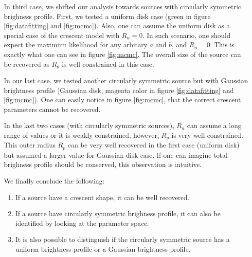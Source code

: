 In third case, we shifted our analysis towards sources with circularly symmetric brighness profile. First, we tested a uniform disk case (green in figure \ref{fig:datafitting} and \ref{fig:mcmc}). Also, one can assume the uniform disk as a special case of the crescent model with $R_n = 0$. In such scenario, one should expect the maximum likelihood for any arbitary $a$ and $b$, and $R_n = 0$. This is exactly what one can see in figure \ref{fig:mcmc}. The overall size of the source can be recovered as $R_p$ is well constrained in this case.

In our last case, we tested another circularly symmetric source but with Gaussian brightness profile (Gaussian disk, magenta color in figure \ref{fig:datafitting} and \ref{fig:mcmc}). One can easily notice in figure \ref{fig:mcmc}, that the correct crescent parameters cannot be recovered. 

In the last two cases (with circularly symmetric sources), $R_n$ can assume a long range of values or it is weakly constrained, however,  $R_p$ is very well constrained. This outer radius $R_p$ can be very well recovered in the first case (uniform disk) but assumed a larger value for Gaussian disk case. If one can imagine total brighness profile should be conserved, this observation is intuitive.

We finally conclude the following:
\begin{enumerate}
 \item If a source have a crescent shape, it can be well recovered. 
 \item If a source have circularly symmetric brighness profile, it can also be identified by looking at the parameter space.
 \item It is also possible to distinguish if the circularly symmetric source has a uniform brightness profile or a Gaussian brightness profile.

 
\end{enumerate}